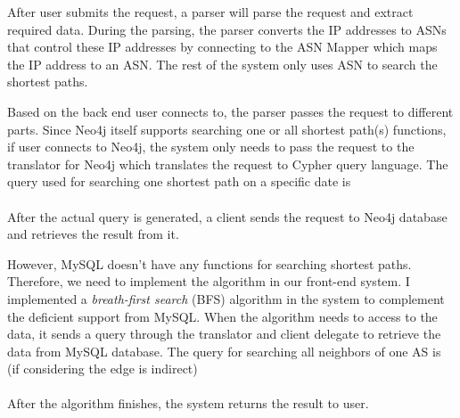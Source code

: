 \documentclass[letterpaper,twocolumn,11pt]{article}
\begin{document}
{After user submits the request, a parser will parse the request and extract required data. During the parsing, the parser converts the IP addresses to ASNs that control these IP addresses by connecting to the ASN Mapper which maps the IP address to an ASN. The rest of the system only uses ASN to search the shortest paths. 

Based on the back end user connects to, the parser passes the request to different parts. Since Neo4j itself supports searching one or all shortest path(s) functions, if user connects to Neo4j, the system only needs to pass the request to the translator for Neo4j which translates the request to Cypher query language. The query used for searching one shortest path on a specific date is \vspace{2pt}\\
 \vspace{2pt}\\
After the actual query is generated, a client sends the request to Neo4j database and retrieves the result from it.

However, MySQL doesn't have any functions for searching shortest paths. Therefore, we need to implement the algorithm in our front-end system. I implemented a {\it breath-first search} (BFS) algorithm in the system to complement the deficient support from MySQL. When the algorithm needs to access to the data, it sends a query through the translator and client delegate to retrieve the data from MySQL database. The query for searching all neighbors of one AS is (if considering the edge is indirect) \vspace{2pt}\\
 \vspace{2pt}\\
After the algorithm finishes, the system returns the result to user. 

}
\end{document}
